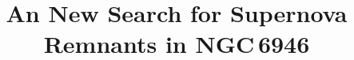 %


\usepackage{natbib}
\usepackage{comment}
\usepackage{todonotes}



\title{An New Search for Supernova Remnants in NGC\,6946}



